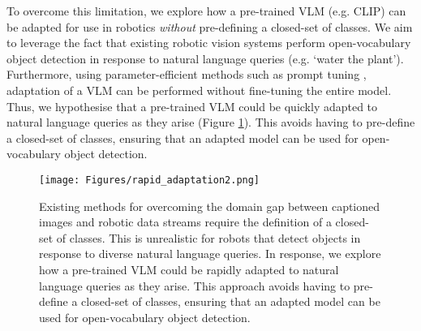 To overcome this limitation, we explore how a pre-trained VLM (e.g. CLIP) can be adapted for use in robotics \textit{without} pre-defining a closed-set of classes. 
We aim to leverage the fact that existing robotic vision systems \cite{conceptgraphs, clio, hovsg} perform open-vocabulary object detection in response to natural language queries (e.g. `water the plant'). Furthermore, using parameter-efficient methods such as prompt tuning \cite{coop, cocoop}, adaptation of a VLM can be performed without fine-tuning the entire model. Thus, we hypothesise that a pre-trained VLM could be quickly adapted to natural language queries as they arise (Figure \ref{domain_shift}). This avoids having to pre-define a closed-set of classes, ensuring that an adapted model can be used for open-vocabulary object detection.

\begin{figure}[!t]
\centering
\texttt{[image: Figures/rapid\_adaptation2.png]}
\caption[Domain Shift for VLMs]{Existing methods for overcoming the domain gap between captioned images and robotic data streams require the definition of a closed-set of classes. This is unrealistic for robots that detect objects in response to diverse natural language queries. In response, we explore how a pre-trained VLM could be rapidly adapted to natural language queries as they arise. 
This approach avoids having to pre-define a closed-set of classes, ensuring that an adapted model can be used for open-vocabulary object detection.
}
\vspace{-1.5em}
\label{domain_shift}
\end{figure}



